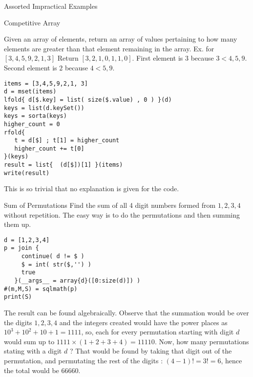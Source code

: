 \begin{section}{Assorted Impractical Examples}
\begin{subsection}{Competitive Array}

Given an array of elements, return an array of values pertaining to 
how many elements are greater than that element remaining in the array. 
Ex. for $ [3,4,5,9,2,1, 3] $  Return $ [3, 2, 1, 0, 1, 1, 0] $. 
First element is $3$ because $3<4,5,9$. Second element is $2$ because $4 < 5,9$.

\begin{center}\begin{minipage}{\linewidth}
\begin{lstlisting}[style=JexlStyle]
items = [3,4,5,9,2,1, 3]
d = mset(items)
lfold{ d[$.key] = list( size($.value) , 0 ) }(d)
keys = list(d.keySet())
keys = sorta(keys)
higher_count = 0 
rfold{
   t = d[$] ; t[1] = higher_count 
   higher_count += t[0]
}(keys)
result = list{  (d[$])[1] }(items)
write(result)
\end{lstlisting}  
\end{minipage}\end{center} 
This is so trivial that no explanation is given for the code.
\end{subsection}


\begin{subsection}{Sum of Permutations}
Find the sum of all 4 digit numbers formed from $1,2,3,4$ without repetition.
The easy way is to do the permutations and then summing them up.

\begin{center}\begin{minipage}{\linewidth}
\begin{lstlisting}[style=JexlStyle]
d = [1,2,3,4]
p = join {
     continue( d != $ )
     $ = int( str($,'') ) 
     true
   }(__args__ = array{d}([0:size(d)]) )
#(m,M,S) = sqlmath(p)
print(S)
\end{lstlisting}  
\end{minipage}\end{center} 

The result can be found algebraically. Observe that the summation would be over the digits $1,2,3,4$ and the 
integers created would have the power places as $10^3 + 10^2 + 10 + 1 = 1111 $, so, each for every permutation
starting with digit $d$ would sum up to $1111 \times ( 1+2+3+4 ) = 11110 $. Now, how many permutations 
stating with a digit $d$ ? That would be found by taking that digit out of the permutation, and permutating
the rest of the digits : $(4-1)! = 3!= 6$, hence the total would be $66660$.   
\end{subsection}


\end{section}
